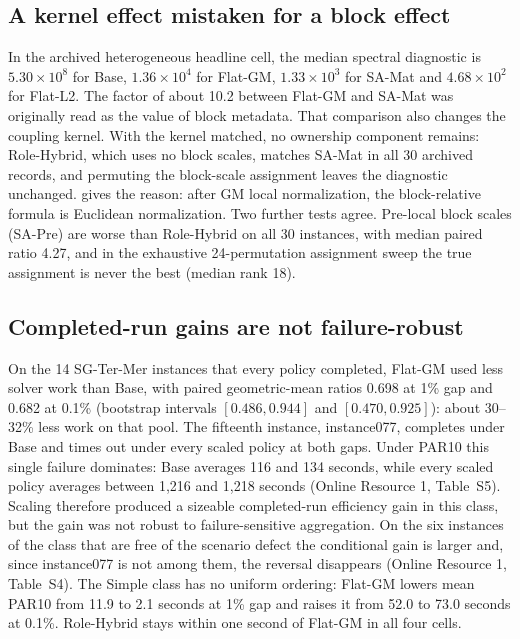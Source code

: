 \documentclass[smallextended,envcountsect,envcountsame]{svjour3}
\begin{document}
\subsection{A kernel effect mistaken for a block effect}
\label{subsec:results-kernel}
In the archived heterogeneous headline cell, the median spectral diagnostic is
$5.30\times10^8$ for Base, $1.36\times10^4$ for Flat-GM, $1.33\times10^3$ for SA-Mat and
$4.68\times10^2$ for Flat-L2. The factor of about 10.2 between Flat-GM and SA-Mat was
originally read as the value of block metadata. That comparison also changes the coupling
kernel. With the kernel matched, no ownership component remains: Role-Hybrid, which uses no
block scales, matches SA-Mat in all 30 archived records, and permuting the block-scale
assignment leaves the diagnostic unchanged.  gives the reason:
after GM local normalization, the block-relative formula is Euclidean normalization. Two
further tests agree. Pre-local block scales (SA-Pre) are worse than Role-Hybrid on all 30
instances, with median paired ratio 4.27, and in the exhaustive 24-permutation assignment sweep
the true assignment is never the best (median rank 18).



\subsection{Completed-run gains are not failure-robust}
\label{subsec:results-operational}
On the 14 SG-Ter-Mer instances that every policy completed, Flat-GM used less solver work than
Base, with paired geometric-mean ratios 0.698 at 1\% gap and 0.682 at 0.1\% (bootstrap
intervals $[0.486,0.944]$ and $[0.470,0.925]$): about 30--32\% less work on that pool. The
fifteenth instance, instance077, completes under Base and times out under every scaled policy
at both gaps. Under PAR10 this single failure dominates: Base averages 116 and 134 seconds,
while every scaled policy averages between 1,216 and 1,218 seconds (Online Resource 1,
Table~S5). Scaling therefore produced a sizeable completed-run efficiency gain in this class,
but the gain was not robust to failure-sensitive aggregation. On the six instances of the class
that are free of the scenario defect the conditional gain is larger and, since instance077 is
not among them, the reversal disappears (Online Resource 1, Table~S4). The Simple class has no uniform ordering: Flat-GM
lowers mean PAR10 from 11.9 to 2.1 seconds at 1\% gap and raises it from 52.0 to 73.0 seconds
at 0.1\%. Role-Hybrid stays within one second of Flat-GM in all four cells.
\end{document}
